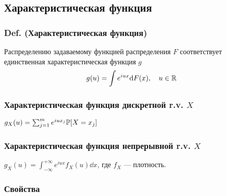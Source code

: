 \subsection{Характеристическая
функция}\label{ux445ux430ux440ux430ux43aux442ux435ux440ux438ux441ux442ux438ux447ux435ux441ux43aux430ux44f-ux444ux443ux43dux43aux446ux438ux44f}

\subsubsection{Def. (Характеристическая
функция)}\label{def.-ux445ux430ux440ux430ux43aux442ux435ux440ux438ux441ux442ux438ux447ux435ux441ux43aux430ux44f-ux444ux443ux43dux43aux446ux438ux44f}

Распределению задаваемому функцией распределения \(F\) соответствует
единственная характеристическая функция \(g\)
\[ g(u) = \int e^{iux} \mathrm d F(x), \quad u\in\mathbb R \]

\subsubsection{\texorpdfstring{Характеристическая функция дискретной
r.v.
\(X\)}{Характеристическая функция дискретной r.v. X}}\label{ux445ux430ux440ux430ux43aux442ux435ux440ux438ux441ux442ux438ux447ux435ux441ux43aux430ux44f-ux444ux443ux43dux43aux446ux438ux44f-ux434ux438ux441ux43aux440ux435ux442ux43dux43eux439-r.v.-x}

\(g_X(u) = \sum_{j=1}^m e^{i u x_j} \mathbb P [X=x_j]\)

\subsubsection{\texorpdfstring{Характеристическая функция непрерывной
r.v.
\(X\)}{Характеристическая функция непрерывной r.v. X}}\label{ux445ux430ux440ux430ux43aux442ux435ux440ux438ux441ux442ux438ux447ux435ux441ux43aux430ux44f-ux444ux443ux43dux43aux446ux438ux44f-ux43dux435ux43fux440ux435ux440ux44bux432ux43dux43eux439-r.v.-x}

\(g_X(u) = \int_{-\infty}^{+\infty} e^{iux} f_X (u) \dd x\), где \(f_X\)
--- плотность.

\subsubsection{Свойства}\label{ux441ux432ux43eux439ux441ux442ux432ux430}

